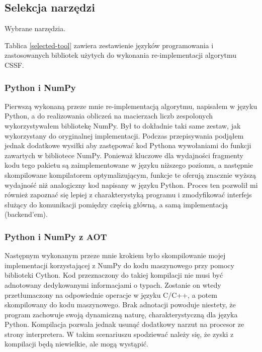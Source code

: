 \documentclass[11pt, a4paper]{article}
\begin{document}
\begin{sloppypar}
    \subsection{Selekcja narzędzi}
    \FloatBarrier
    \begin{table}[ht]
      \centering
      
      \caption{Wybrane narzędzia.}
      \label{selected-tool}
    \end{table}
    \FloatBarrier

    Tablica \ref{selected-tool} zawiera zestawienie języków programowania i
    zastosowanych bibliotek użytych do wykonania re-implementacji algorytmu CSSF.

    \subsubsection{Python i NumPy}
    Pierwszą wykonaną przeze mnie re-implementacją algorytmu, napisałem w języku Python,
    a do realizowania obliczeń na macierzach liczb zespolonych wykorzystywałem
    bibliotekę NumPy. Był to dokładnie taki same zestaw, jak wykorzystany do oryginalnej
    implementacji. Podczas przepisywania podjąłem jednak dodatkowe wysiłki aby zastępować
    kod Pythona wywołaniami do funkcji zawartych w bibliotece NumPy. Ponieważ kluczowe
    dla wydajności fragmenty kodu tego pakietu są zaimplementowane w języku niższego
    poziomu, a następnie skompilowane kompilatorem optymalizującym, funkcje te oferują
    znacznie wyższą wydajność niż analogiczny kod napisany w języku Python. Proces ten pozwolił
    mi również zapoznać się lepiej z charakterystyką programu i zmodyfikować interfejs służący
    do komunikacji pomiędzy częścią główną, a samą implementacją (backend'em).

    \subsubsection{Python i NumPy z AOT}
    Następnym wykonanym przeze mnie krokiem było skompilowanie mojej implementacji
    korzystającej z NumPy do kodu maszynowego przy pomocy biblioteki Cython. Kod przeznaczony
    do takiej kompilacji nie musi być adnotowany dedykowanymi informacjami o typach.
    Zostanie on wtedy przetłumaczony na odpowiednie operacje w języku C/C++, a potem skompilowany
    do kodu maszynowego. Brak adnotacji powoduje niestety, że program zachowuje swoją dynamiczną
    naturę, charakterystyczną dla języka Python. Kompilacja pozwala jednak usunąć dodatkowy
    narzut na procesor ze strony interpretera. W takim scenariuszu spodziewać należy się,
    że zyski z kompilacji będą niewielkie, ale mogą wystąpić.


\end{sloppypar}
\end{document}
